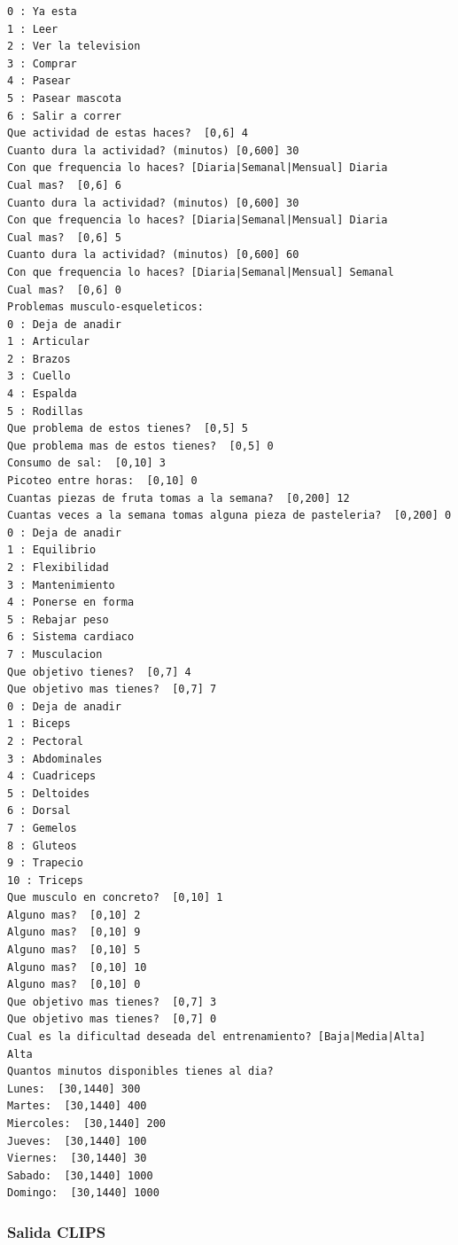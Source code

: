 \documentclass[a4paper, 12pt, UTF8]{article}
\begin{document}
\begin{verbatim}
0 : Ya esta
1 : Leer
2 : Ver la television
3 : Comprar
4 : Pasear
5 : Pasear mascota
6 : Salir a correr
Que actividad de estas haces?  [0,6] 4
Cuanto dura la actividad? (minutos) [0,600] 30
Con que frequencia lo haces? [Diaria|Semanal|Mensual] Diaria
Cual mas?  [0,6] 6
Cuanto dura la actividad? (minutos) [0,600] 30
Con que frequencia lo haces? [Diaria|Semanal|Mensual] Diaria
Cual mas?  [0,6] 5
Cuanto dura la actividad? (minutos) [0,600] 60
Con que frequencia lo haces? [Diaria|Semanal|Mensual] Semanal
Cual mas?  [0,6] 0
Problemas musculo-esqueleticos: 
0 : Deja de anadir
1 : Articular
2 : Brazos
3 : Cuello
4 : Espalda
5 : Rodillas
Que problema de estos tienes?  [0,5] 5
Que problema mas de estos tienes?  [0,5] 0
Consumo de sal:  [0,10] 3
Picoteo entre horas:  [0,10] 0
Cuantas piezas de fruta tomas a la semana?  [0,200] 12
Cuantas veces a la semana tomas alguna pieza de pasteleria?  [0,200] 0
0 : Deja de anadir
1 : Equilibrio
2 : Flexibilidad
3 : Mantenimiento
4 : Ponerse en forma
5 : Rebajar peso
6 : Sistema cardiaco
7 : Musculacion
Que objetivo tienes?  [0,7] 4
Que objetivo mas tienes?  [0,7] 7
0 : Deja de anadir
1 : Biceps
2 : Pectoral
3 : Abdominales
4 : Cuadriceps
5 : Deltoides
6 : Dorsal
7 : Gemelos
8 : Gluteos
9 : Trapecio
10 : Triceps
Que musculo en concreto?  [0,10] 1
Alguno mas?  [0,10] 2
Alguno mas?  [0,10] 9
Alguno mas?  [0,10] 5
Alguno mas?  [0,10] 10
Alguno mas?  [0,10] 0
Que objetivo mas tienes?  [0,7] 3
Que objetivo mas tienes?  [0,7] 0
Cual es la dificultad deseada del entrenamiento? [Baja|Media|Alta] Alta
Quantos minutos disponibles tienes al dia?
Lunes:  [30,1440] 300
Martes:  [30,1440] 400
Miercoles:  [30,1440] 200
Jueves:  [30,1440] 100
Viernes:  [30,1440] 30
Sabado:  [30,1440] 1000
Domingo:  [30,1440] 1000
\end{verbatim}

\subsubsection{Salida CLIPS}
\end{document}
